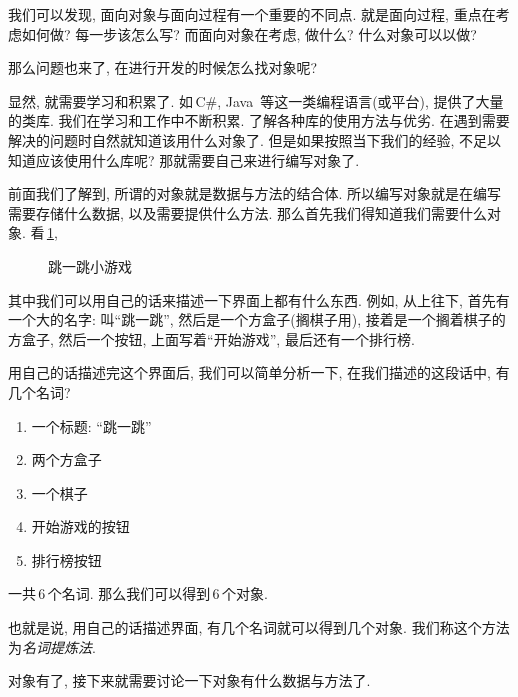 我们可以发现, 面向对象与面向过程有一个重要的不同点. 就是面向过程, 重点在考虑如何做? 每一步该怎么写?
而面向对象在考虑, 做什么? 什么对象可以以做? 

那么问题也来了, 在进行开发的时候怎么找对象呢? 

显然, 就需要学习和积累了. 如\,C\#, Java\, 等这一类编程语言(或平台), 提供了大量的类库. 
我们在学习和工作中不断积累. 了解各种库的使用方法与优劣. 在遇到需要解决的问题时自然就知道该用什么对象了.
但是如果按照当下我们的经验, 不足以知道应该使用什么库呢? 那就需要自己来进行编写对象了.

前面我们了解到, 所谓的对象就是数据与方法的结合体. 所以编写对象就是在编写需要存储什么数据, 
以及需要提供什么方法. 那么首先我们得知道我们需要什么对象. 看\,\figurename\ref{ch01_0001}, 
%
\begin{figure}[htb!p]
{}

\caption{跳一跳小游戏\label{ch01_0001}}
\end{figure}
%
其中我们可以用自己的话来描述一下界面上都有什么东西. 
例如, 从上往下, 首先有一个大的名字: 叫``跳一跳'', 然后是一个方盒子(搁棋子用), 
接着是一个搁着棋子的方盒子, 然后一个按钮, 上面写着``开始游戏'', 最后还有一个排行榜.

用自己的话描述完这个界面后, 我们可以简单分析一下, 在我们描述的这段话中, 有几个名词?
%
\begin{enumerate}
\item 一个标题: ``跳一跳''
\item 两个方盒子
\item 一个棋子 
\item 开始游戏的按钮
\item 排行榜按钮
\end{enumerate}
%
一共\,6\,个名词. 那么我们可以得到\,6\,个对象. 

也就是说, 用自己的话描述界面, 有几个名词就可以得到几个对象. 我们称这个方法为\emph{名词提炼法}.

对象有了, 接下来就需要讨论一下对象有什么数据与方法了.

